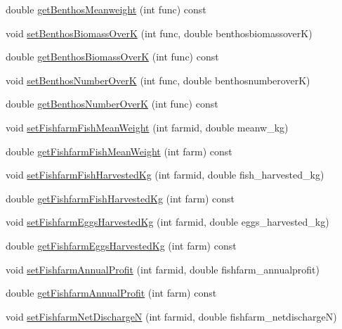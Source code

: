 \begin{DoxyCompactItemize}
\item 
double \mbox{\hyperlink{class_node_data_abdeb1b6139a106095176afc642093f84}{get\+Benthos\+Meanweight}} (int func) const
\item 
void \mbox{\hyperlink{class_node_data_af1476c229f470b93181304ea0d9206c4}{set\+Benthos\+Biomass\+OverK}} (int func, double benthosbiomassoverK)
\item 
double \mbox{\hyperlink{class_node_data_a91277a282736a954314de11c5555e2b4}{get\+Benthos\+Biomass\+OverK}} (int func) const
\item 
void \mbox{\hyperlink{class_node_data_ae740bb9dcafae45bcd5bd3f00d592c0e}{set\+Benthos\+Number\+OverK}} (int func, double benthosnumberoverK)
\item 
double \mbox{\hyperlink{class_node_data_a4e4503446ae7b004aa9e83d1851441ee}{get\+Benthos\+Number\+OverK}} (int func) const
\item 
void \mbox{\hyperlink{class_node_data_ac37ac9705ee216314bef2042008dc3a4}{set\+Fishfarm\+Fish\+Mean\+Weight}} (int farmid, double meanw\+\_\+kg)
\item 
double \mbox{\hyperlink{class_node_data_a9d3fa7a18dde95e27f5bdb30cbb6d5b4}{get\+Fishfarm\+Fish\+Mean\+Weight}} (int farm) const
\item 
void \mbox{\hyperlink{class_node_data_a761da675ad9067e9c13f75c1f0f2d268}{set\+Fishfarm\+Fish\+Harvested\+Kg}} (int farmid, double fish\+\_\+harvested\+\_\+kg)
\item 
double \mbox{\hyperlink{class_node_data_a69e8c2c82c870caf36a1dbd7a06e53f8}{get\+Fishfarm\+Fish\+Harvested\+Kg}} (int farm) const
\item 
void \mbox{\hyperlink{class_node_data_a948b2c7ae9c22e0aa5fb0e5d88d4fac2}{set\+Fishfarm\+Eggs\+Harvested\+Kg}} (int farmid, double eggs\+\_\+harvested\+\_\+kg)
\item 
double \mbox{\hyperlink{class_node_data_a1a846d56eb78c9ba55cc630bff5e4528}{get\+Fishfarm\+Eggs\+Harvested\+Kg}} (int farm) const
\item 
void \mbox{\hyperlink{class_node_data_a50c5b5b85c44fe7b2bedc1fb7ff5994a}{set\+Fishfarm\+Annual\+Profit}} (int farmid, double fishfarm\+\_\+annualprofit)
\item 
double \mbox{\hyperlink{class_node_data_a546461c56ed647c70c39eb0dad1c26cc}{get\+Fishfarm\+Annual\+Profit}} (int farm) const
\item 
void \mbox{\hyperlink{class_node_data_a4f83b327f42474a893ac884c155c711a}{set\+Fishfarm\+Net\+DischargeN}} (int farmid, double fishfarm\+\_\+netdischargeN)
\item 

\end{DoxyCompactItemize}
